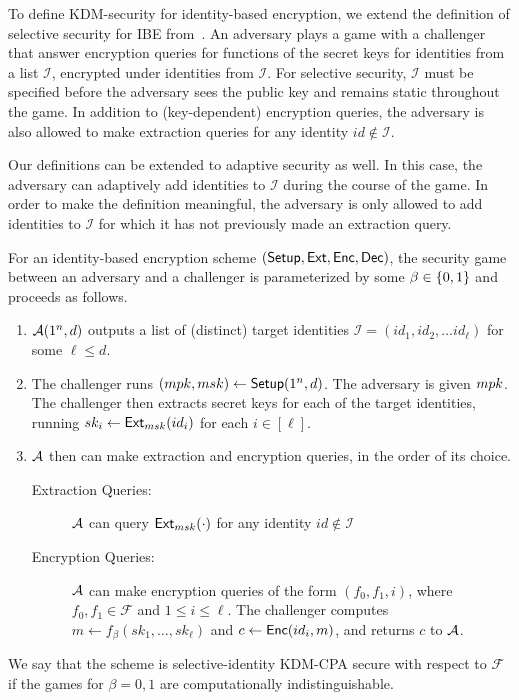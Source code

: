 To define KDM-security for identity-based encryption, we extend the
definition of selective security for IBE
from~\cite{DBLP:journals/joc/CanettiHK07,
  DBLP:journals/siamcomp/BonehCHK07}. An adversary plays a game with a
challenger that answer encryption queries for functions of the secret
keys for identities from a list $\mathcal{I}$, encrypted under
identities from $\mathcal{I}$. For selective security, $\mathcal{I}$
must be specified before the adversary sees the public key and remains
static throughout the game. In addition to (key-dependent) encryption
queries, the adversary is also allowed to make extraction queries for
any identity $id \notin \mathcal{I}$.

Our definitions can be extended to adaptive security as well. In this
case, the adversary can adaptively add identities to $\mathcal{I}$
during the course of the game. In order to make the definition
meaningful, the adversary is only allowed to add identities to
$\mathcal{I}$ for which it has not previously made an extraction
query.

\fi

For an identity-based encryption scheme $(\mathsf{Setup}, \mathsf{Ext}, \mathsf{Enc},
\mathsf{Dec})$, the security game between an adversary and a challenger is
parameterized by some $\beta \in \{{0,1}\}$ and proceeds as follows.
\begin{enumerate}[itemsep=0pt]
\item $\mathcal{A}(1^n, d)$ outputs a list of (distinct) target identities
  $\mathcal{I} = (id_1, id_2, \ldots id_{\ell})$ for some $\ell \leq
  d$.
\item The challenger runs $(mpk, msk) \gets \mathsf{Setup}(1^n, d)$. The
  adversary is given $mpk$. The challenger then extracts secret keys
  for each of the target identities, running $sk_{i} \gets
  \mathsf{Ext}_{msk}(id_i)$ for each $i \in [\ell]$.
\item $\mathcal{A}$ then can make extraction and encryption queries, in the
  order of its choice.
  \begin{description}
  \item[Extraction Queries:] $\mathcal{A}$ can query $\mathsf{Ext}_{msk}(\cdot)$
    for any identity $id \notin \mathcal{I}$
  \item[Encryption Queries:] $\mathcal{A}$ can make encryption queries of the
    form $(f_0, f_1, i)$, where $f_0, f_1 \in \mathcal{F}$ and $1 \leq
    i \leq \ell$.  The challenger computes $m \gets f_{\beta}(sk_1,
    \ldots, sk_{\ell})$ and $c \gets \mathsf{Enc}(id_i, m)$, and returns
    $c$ to $\mathcal{A}$.
  \end{description}
\end{enumerate}
We say that the scheme is selective-identity KDM-CPA secure with
respect to $\mathcal{F}$ if the games for $\beta=0,1$ are
computationally indistinguishable.

